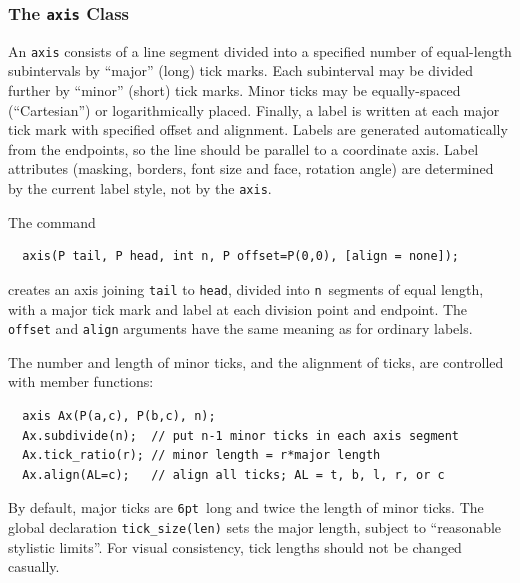 \documentclass[12pt,letterpaper]{book}
\newcommand{\code}[1]{\texttt{#1}}
\newcommand{\findex}[1]{\ignorespaces}
\begin{document}
\subsubsection*{The \code{axis} Class}

An \code{axis} consists of a line segment divided into a specified
number of equal-length subintervals by ``major'' (long) tick marks.
Each subinterval may be divided further by ``minor'' (short) tick
marks.  Minor ticks may be equally-spaced (``Cartesian'') or
logarithmically placed. Finally, a label is written at each major tick
mark with specified offset and alignment. Labels are generated
automatically from the endpoints, so the line should be parallel to a
coordinate axis. Label attributes (masking, borders, font size and
face, rotation angle) are determined by the current label style, not
by the \code{axis}.

The command
\findex{axis}
\begin{verbatim}
  axis(P tail, P head, int n, P offset=P(0,0), [align = none]);
\end{verbatim}
creates an axis joining \code{tail} to \code{head}, divided into
\code{n}~segments of equal length, with a major tick mark and label at
each division point and endpoint. The \code{offset} and \code{align}
arguments have the same meaning as for ordinary labels.

The number and length of minor ticks, and the alignment of ticks, are
controlled with member functions:
\findex{axis.subdivide}
\findex{axis.tick\_ratio}
\findex{axis.align}
\begin{verbatim}
  axis Ax(P(a,c), P(b,c), n);
  Ax.subdivide(n);  // put n-1 minor ticks in each axis segment
  Ax.tick_ratio(r); // minor length = r*major length
  Ax.align(AL=c);   // align all ticks; AL = t, b, l, r, or c
\end{verbatim}
By default, major ticks are \code{6pt}~long and twice the length of
minor ticks. The global declaration \code{tick\_size(len)} sets the
major length, subject to ``reasonable stylistic limits''. For visual
consistency, tick lengths should not be changed casually. 
\end{document}
